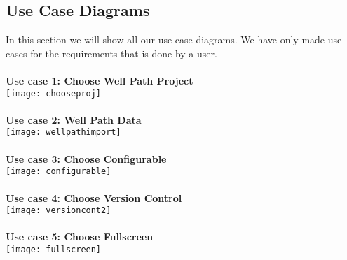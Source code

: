 \documentclass{report}
\begin{document}
\subsection{Use Case Diagrams} \label{subsec:use_case_diagrams}
In this section we will show all our use case diagrams. We have only made use cases for the requirements that is done by a user.\\\\
\textbf{Use case 1: Choose Well Path Project}\\
\texttt{[image: chooseproj]} \\\\
\textbf{Use case 2: Well Path Data}\\
\texttt{[image: wellpathimport]} \\\\
\textbf{Use case 3: Choose Configurable}\\
\texttt{[image: configurable]} \\\\
\textbf{Use case 4: Choose Version Control}\\
\texttt{[image: versioncont2]} \\\\
\textbf{Use case 5: Choose Fullscreen}\\
\texttt{[image: fullscreen]} \\\\
\end{document}
